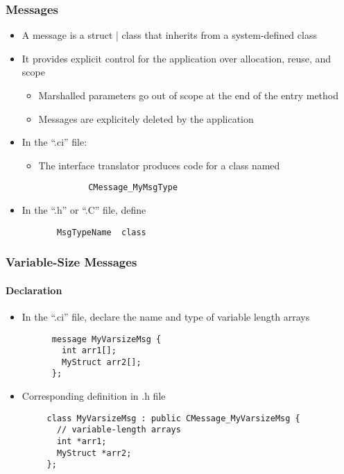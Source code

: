 
\begin{frame}[fragile]
  \frametitle{Messages}
  \begin{itemize}
    \item A message is a struct | class that inherits from a system-defined class
    \item It provides explicit control for the application over allocation, reuse, and scope
    \begin{itemize}
      \item Marshalled parameters go out of scope at the end of the entry method
      \item Messages are explicitely deleted by the application
    \end{itemize}
    \item In the ``.ci'' file:
      \begin{itemize}
         \begin{lstlisting}
          message MyMsgType;
         \end{lstlisting}
         \item The interface translator produces code for a class named
         \begin{lstlisting}
          CMessage_MyMsgType
         \end{lstlisting}
      \end{itemize} 
      \item In the “.h” or “.C” file, define
      \begin{lstlisting}
       MsgTypeName  class
      \end{lstlisting}
  \end{itemize}
\end{frame}

\begin{frame}[fragile]
  \frametitle{Variable-Size Messages}
  \framesubtitle{Declaration}
  \begin{itemize}
    \item In the “.ci” file, declare the name and type of variable length arrays
    \begin{lstlisting}
      message MyVarsizeMsg {
        int arr1[];
        MyStruct arr2[];
      };
    \end{lstlisting}
    \item Corresponding definition in .h file
    \begin{lstlisting}
     class MyVarsizeMsg : public CMessage_MyVarsizeMsg {
       // variable-length arrays
       int *arr1;
       MyStruct *arr2;
     };
    \end{lstlisting}
  \end{itemize}
\end{frame}

